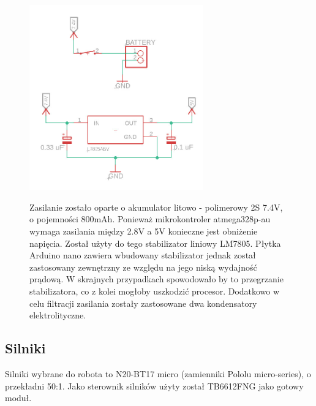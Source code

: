 \documentclass[polish,polish,a4paper]{article}
\begin{document}
     \begin{figure}[!htb]
       \begin{minipage}{0.3\textwidth}

        \centering
        \includegraphics[width=75mm]{Scheme/zasilanie.jpg}
        
       \end{minipage} \hspace{35mm}
       \begin{minipage}{0.5\textwidth}
         
          Zasilanie zostało oparte o akumulator litowo - polimerowy 2S 7.4V, o pojemności 800mAh.  
        \newline
        \newline
        Ponieważ mikrokontroler atmega328p-au wymaga zasilania między 2.8V a 5V konieczne jest obniżenie napięcia. Został użyty do tego stabilizator liniowy LM7805. Płytka Arduino nano zawiera wbudowany stabilizator jednak został zastosowany zewnętrzny ze względu na jego niską wydajność prądową. W skrajnych przypadkach spowodowało by to przegrzanie stabilizatora, co z kolei mogłoby uszkodzić procesor.
        \newline
        \newline
        Dodatkowo w celu filtracji zasilania zostały zastosowane dwa kondensatory elektrolityczne.
        
       \end{minipage}
        \end{figure}

    \subsection{Silniki}
        Silniki wybrane do robota to N20-BT17 micro (zamienniki Pololu micro-series), o przekładni 50:1.
        \newline
        Jako sterownik silników użyty został TB6612FNG jako gotowy moduł.  
        
\end{document}
